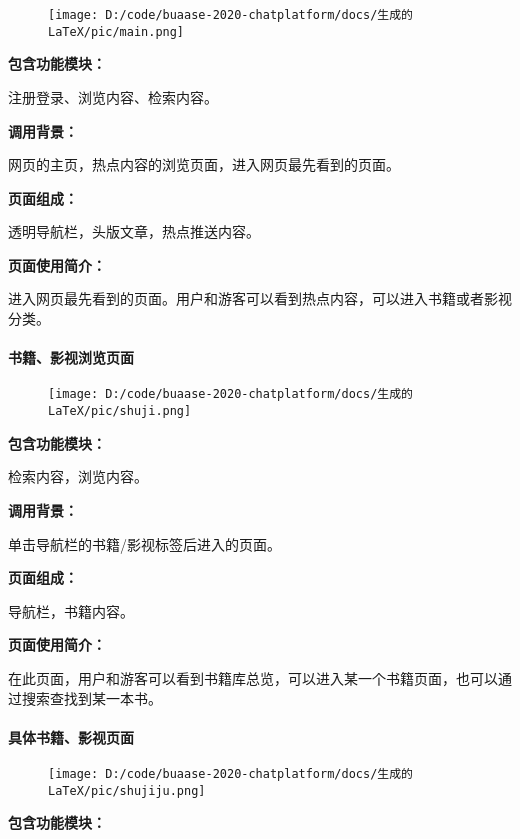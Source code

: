 \documentclass[
]{article}
\begin{document}
\begin{figure}
\centering
\texttt{[image: D:/code/buaase-2020-chatplatform/docs/生成的LaTeX/pic/main.png]}
\caption{}
\end{figure}

\textbf{包含功能模块：}

注册登录、浏览内容、检索内容。

\textbf{调用背景：}

网页的主页，热点内容的浏览页面，进入网页最先看到的页面。

\textbf{页面组成：}

透明导航栏，头版文章，热点推送内容。

\textbf{页面使用简介：}

进入网页最先看到的页面。用户和游客可以看到热点内容，可以进入书籍或者影视分类。

\hypertarget{header-n1302}{%
\paragraph{书籍、影视浏览页面}\label{header-n1302}}

\begin{figure}
\centering
\texttt{[image: D:/code/buaase-2020-chatplatform/docs/生成的LaTeX/pic/shuji.png]}
\caption{}
\end{figure}

\textbf{包含功能模块：}

检索内容，浏览内容。

\textbf{调用背景：}

单击导航栏的书籍/影视标签后进入的页面。

\textbf{页面组成：}

导航栏，书籍内容。

\textbf{页面使用简介：}

在此页面，用户和游客可以看到书籍库总览，可以进入某一个书籍页面，也可以通过搜索查找到某一本书。

\hypertarget{header-n1312}{%
\paragraph{具体书籍、影视页面}\label{header-n1312}}

\begin{figure}
\centering
\texttt{[image: D:/code/buaase-2020-chatplatform/docs/生成的LaTeX/pic/shujiju.png]}
\caption{}
\end{figure}

\textbf{包含功能模块：}
\end{document}
